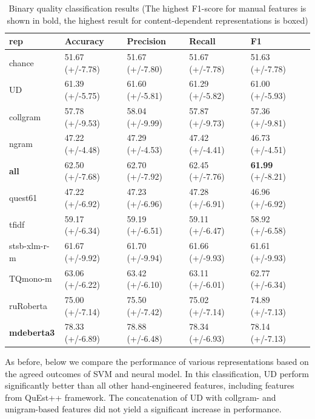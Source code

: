 \begin{table}[H]
	\centering
	\begin{tabular}{l|llll}
		\toprule
		rep      & Accuracy         & Precision        & Recall           & F1               \\
		\midrule
		chance          & 51.67 (+/-7.78) & 51.67 (+/-7.80) & 51.67 (+/-7.78) & 51.63 (+/-7.78) \\
		\midrule
		UD              & 61.39 (+/-5.75) & 61.60 (+/-5.81) & 61.29 (+/-5.82) & 61.00 (+/-5.93) \\
		collgram        & 57.78 (+/-9.53) & 58.04 (+/-9.99) & 57.87 (+/-9.73) & 57.36 (+/-9.81) \\
		ngram           & 47.22 (+/-4.48) & 47.29 (+/-4.53) & 47.42 (+/-4.41) & 46.73 (+/-4.51) \\
		\textbf{all}             & 62.50 (+/-7.68) & 62.70 (+/-7.92) & 62.45 (+/-7.76) & \textbf{61.99} (+/-8.21) \\
		\midrule
		quest61         & 47.22 (+/-6.92) & 47.23 (+/-6.96) & 47.28 (+/-6.91) & 46.96 (+/-6.92) \\
		\midrule
		tfidf           & 59.17 (+/-6.34) & 59.19 (+/-6.51) & 59.11 (+/-6.47) & 58.92 (+/-6.58) \\
		stsb-xlm-r-m          & 61.67 (+/-9.92) & 61.70 (+/-9.94) & 61.66 (+/-9.93) & 61.61 (+/-9.93) \\
		TQmono-m        & 63.06 (+/-6.22) & 63.42 (+/-6.10) & 63.11 (+/-6.01) & 62.77 (+/-6.34) \\
		ruRoberta & 75.00 (+/-7.14) & 75.50 (+/-7.42) & 75.02 (+/-7.14) & 74.89 (+/-7.13) \\
		\textbf{mdeberta3}  & 78.33 (+/-6.89) & 78.88 (+/-6.48) & 78.34 (+/-6.93) & \boxit{0.4in}78.14 (+/-7.13)\\
		\bottomrule
	\end{tabular}
	\caption{\label{tab:bad-good}Binary quality classification results (The highest F1-score for manual features is shown in bold, the highest result for content-dependent representations is boxed)}
\end{table}

As before, below we compare the performance of various representations based on the agreed outcomes of SVM and neural model. 
In this classification, UD perform significantly better than all other hand-engineered features, including features from QuEst++ framework. The concatenation of UD with collgram- and unigram-based features did not yield a significant increase in performance. 

